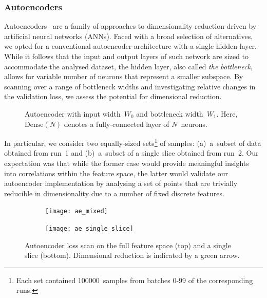 \subsubsection{Autoencoders}

Autoencoders~\cite{SCHMIDHUBER201585} are a family of approaches to
dimensionality reduction driven by artificial neural
networks (ANNs). Faced with a broad selection of alternatives, we opted for a
conventional autoencoder architecture with a single hidden layer. While it
follows that the input and output layers of such
network are sized to accommodate the analysed dataset, the
hidden layer, also called \textit{the bottleneck}, allows for variable number of
neurons that represent a smaller subspace. By scanning
over a range of bottleneck widths and investigating relative changes in the
validation loss, we assess the potential for dimensional reduction.

\begin{figure}
	\centering
	{\footnotesize {}}
	\caption{Autoencoder with input width~$W_0$ and bottleneck width~$W_1$.
	Here, $\text{Dense}(N)$ denotes a fully-connected layer of $N$~neurons.}
	\label{fig:autoencoder}
\end{figure}

In particular, we consider two equally-sized sets\footnote{Each set contained
\num{100000}~samples from batches 0-99 of the corresponding runs.} of samples:
(a)~a~subset of data obtained
from run~1 and (b)~a~subset of a single slice obtained from run~2. Our
expectation was that while the former case would provide meaningful insights into
correlations within the feature space, the latter would validate our
autoencoder implementation by analysing a set of points that are trivially
reducible in dimensionality due to a number of fixed discrete features.

\begin{figure}
	\centering
	\vspace{-4ex}

	\begin{subfigure}[b]{\linewidth}
		\texttt{[image: ae\_mixed]}
	\end{subfigure}

	\vspace{-0.2ex}

	\begin{subfigure}[b]{\linewidth}
		\texttt{[image: ae\_single\_slice]}
	\end{subfigure}

	\caption{Autoencoder loss scan on the full feature space (top) and a single slice
		(bottom). Dimensional reduction is indicated by a green arrow.}
	\label{fig:autoencoder-loss}
\end{figure}

